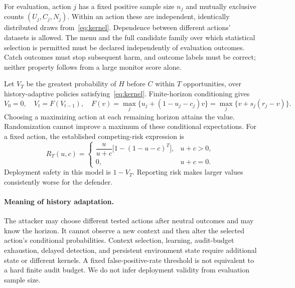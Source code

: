 \documentclass[10pt]{article}
\begin{document}
For evaluation, action $j$ has a fixed positive sample size $n_j$ and mutually exclusive counts $(U_j,C_j,N_j)$. Within an action these are independent, identically distributed draws from~\eqref{eq:kernel}. Dependence between different actions' datasets is allowed. The menu and the full candidate family over which statistical selection is permitted must be declared independently of evaluation outcomes. Catch outcomes must stop subsequent harm, and outcome labels must be correct; neither property follows from a large monitor score alone.

Let $V_T$ be the greatest probability of $H$ before $C$ within $T$ opportunities, over history-adaptive policies satisfying~\eqref{eq:kernel}. Finite-horizon conditioning gives
\begin{equation}
V_0=0,\quad V_t=F(V_{t-1}),\quad
F(v)=\max_j\{u_j+(1-u_j-c_j)v\}=\max_j\{v+s_j(r_j-v)\}.\label{eq:bellman}
\end{equation}
Choosing a maximizing action at each remaining horizon attains the value. Randomization cannot improve a maximum of these conditional expectations. For a fixed action, the established competing-risk expression is
\begin{equation}
R_T(u,c)=\begin{cases}\dfrac{u}{u+c}\bigl[1-(1-u-c)^T\bigr],&u+c>0,\\0,&u+c=0.\end{cases}\label{eq:fixed}
\end{equation}
Deployment safety in this model is $1-V_T$. Reporting risk makes larger values consistently worse for the defender.

\paragraph{Meaning of history adaptation.}
The attacker may choose different tested actions after neutral outcomes and may know the horizon. It cannot observe a new context and then alter the selected action's conditional probabilities. Context selection, learning, audit-budget exhaustion, delayed detection, and persistent environment state require additional state or different kernels. A fixed false-positive-rate threshold is not equivalent to a hard finite audit budget. We do not infer deployment validity from evaluation sample size.
\end{document}
